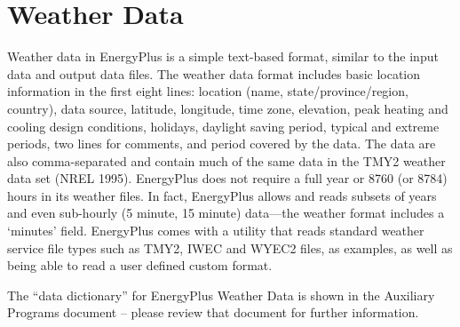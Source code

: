\chapter{Weather Data}\label{weather-data}

Weather data in EnergyPlus is a simple text-based format, similar to the input data and output data files. The weather data format includes basic location information in the first eight lines: location (name, state/province/region, country), data source, latitude, longitude, time zone, elevation, peak heating and cooling design conditions, holidays, daylight saving period, typical and extreme periods, two lines for comments, and period covered by the data. The data are also comma-separated and contain much of the same data in the TMY2 weather data set (NREL 1995). EnergyPlus does not require a full year or 8760 (or 8784) hours in its weather files. In fact, EnergyPlus allows and reads subsets of years and even sub-hourly (5 minute, 15 minute) data---the weather format includes a `minutes' field. EnergyPlus comes with a utility that reads standard weather service file types such as TMY2, IWEC and WYEC2 files, as examples, as well as being able to read a user defined custom format.

The ``data dictionary'' for EnergyPlus Weather Data is shown in the Auxiliary Programs document -- please review that document for further information.
